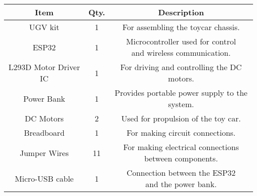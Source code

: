\begin{tabular}[12pt]{ |c| c| c|}
    \hline
    \textbf{Item} & \textbf{Qty.} & \textbf{Description} \\ 
    \hline
    UGV kit & 1 & For assembling the toycar chassis.\\ 
    \hline
    ESP32 & 1 & \makecell{Microcontroller used for control \\ and wireless communication.} \\
    \hline
    L293D Motor Driver IC & 1 & For driving and controlling the DC motors. \\ 
    \hline
    Power Bank & 1 & Provides portable power supply to the system. \\
    \hline
    DC Motors & 2 & Used for propulsion of the toy car. \\
    \hline
    Breadboard & 1 & For making circuit connections. \\
    \hline
    Jumper Wires & 11 & \makecell{For making electrical connections \\ between components.} \\
    \hline
    Micro-USB cable & 1 & \makecell{Connection between the ESP32 \\ and the power bank.} \\
    \hline
    \end{tabular}


